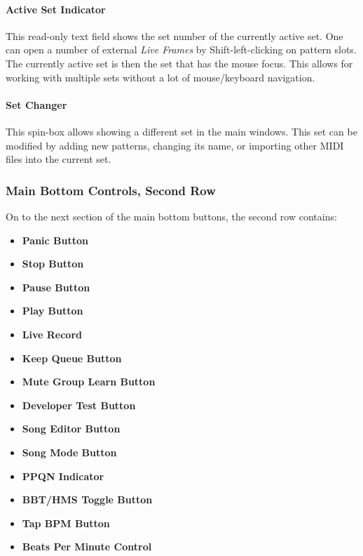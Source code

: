 \documentclass[
 11pt,
 twoside,
 a4paper,
 final                                 %
]{article}
\begin{document}
\paragraph{Active Set Indicator}
\label{paragraph:introduction_active_set_indicator}

   This read-only text field shows the set number of the currently active set.
   One can open a number of external \textsl{Live Frames} by
   Shift-left-clicking on pattern slots.  The currently active set is then the
   set that has the mouse focus.  This allows for working with multiple sets
   without a lot of mouse/keyboard navigation.

\paragraph{Set Changer}
\label{paragraph:introduction_set_changer}

   This spin-box allows showing a different set in the main windows.
   This set can be modified by adding new patterns, changing its name, or
   importing other MIDI files into the current set.

\subsubsection{Main Bottom Controls, Second Row}
\label{subsubsec:introduction_main_bottom_controls_2}

   On to the next section of the main bottom buttons, the second row contains:

   \begin{itemize}
      \item \textbf{Panic Button}
      \item \textbf{Stop Button}
      \item \textbf{Pause Button}
      \item \textbf{Play Button}
      \item \textbf{Live Record}
      \item \textbf{Keep Queue Button}
      \item \textbf{Mute Group Learn Button}
      \item \textbf{Developer Test Button}
      \item \textbf{Song Editor Button}
      \item \textbf{Song Mode Button}
      \item \textbf{PPQN Indicator}
      \item \textbf{BBT/HMS Toggle Button}
      \item \textbf{Tap BPM Button}
      \item \textbf{Beats Per Minute Control}
   \end{itemize}
\end{document}
